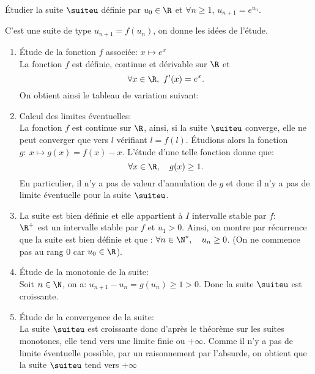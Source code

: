 \documentclass[a4paper, 11pt]{article}
\begin{document}
\begin{exercice} \;
\'Etudier la suite $\suiteu$ d\'efinie par  $u_0\in \R$ et $\forall n \geq 1$, $u_{n+1}=e^{u_n}.$
%
\end{exercice}

\begin{correction} \;
C'est une suite de type $u_{n+1}=f(u_n)$, on donne les id\'ees de l'\'etude.
\begin{enumerate}
 \item \'Etude de la fonction $f$ associ\'ee: $x\mapsto e^x$\\
\noindent  La fonction $f$ est d\'efinie, continue et d\'erivable sur $\R$ et 
$$\forall x\in\R,\ f^{\prime}(x)=e^x.$$
On obtient ainsi le tableau de variation suivant:
\begin{center}
\end{center}
\item Calcul des limites \'eventuelles:\\
\noindent La fonction $f$ est continue sur $\R$, ainsi, si la suite $\suiteu$ converge, elle ne peut converger que vers $l$ v\'erifiant 
$l=f(l)$. 
\'Etudions alors la fonction $g:\ x\mapsto g(x)=f(x)-x$. L'\'etude d'une telle fonction donne que:
$$\forall x\in\R,\quad g(x)\geq 1.$$
En particulier, il n'y a pas de valeur d'annulation de $g$ et donc il n'y a pas de limite \'eventuelle pour la suite $\suiteu$.
\item La suite est bien d\'efinie et elle appartient \`{a} $I$ intervalle stable par $f$:\\
\noindent $\R^+$ est un intervalle stable par $f$ et $u_1>0$.
\noindent Ainsi, on montre par r\'ecurrence que la suite est bien d\'efinie et que : $\forall n\in\N^{\star},\quad u_n \geq 0$. (On ne commence pas au rang 0 car $u_0\in\R$).
\item \'Etude de la monotonie de la suite:\\
\noindent Soit $n\in\N$, on a: $u_{n+1}-u_n=g(u_n)\geq 1>0$. Donc la suite $\suiteu$ est croissante.
\item \'Etude de la convergence de la suite:\\
\noindent La suite $\suiteu$ est croissante donc d'apr\`es le th\'eor\`eme sur les suites monotones, elle tend vers une limite finie ou $+\infty$. Comme il n'y a pas de limite \'eventuelle possible, par un raisonnement par l'absurde, on obtient que la suite $\suiteu$ tend vers $+\infty$
\end{enumerate}
\end{correction}
\end{document}
